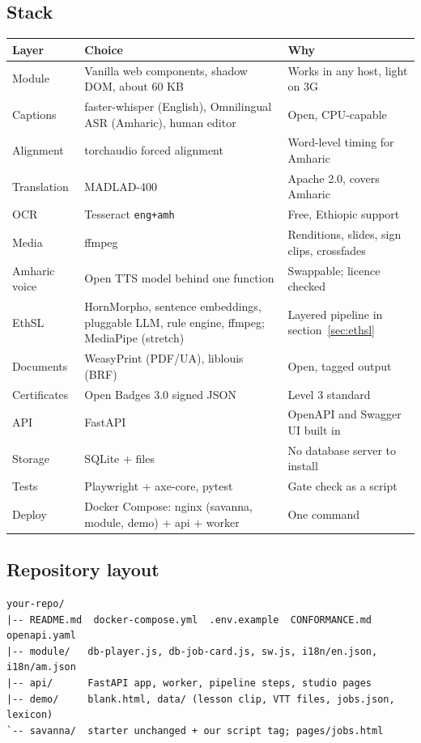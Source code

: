 \documentclass[11pt,a4paper]{article}
\newcommand{\code}[1]{\texttt{#1}}
\begin{document}
\subsection{Stack}
\begin{xltabular}{\textwidth}{@{}>{\raggedright\arraybackslash}p{2.6cm} X >{\raggedright\arraybackslash}p{4cm}@{}}
\toprule
\textbf{Layer} & \textbf{Choice} & \textbf{Why} \\
\midrule
\endhead
Module & Vanilla web components, shadow DOM, about 60 KB & Works in any host, light on 3G \\
Captions & faster-whisper (English), Omnilingual ASR (Amharic), human editor & Open, CPU-capable \\
Alignment & torchaudio forced alignment & Word-level timing for Amharic \\
Translation & MADLAD-400 & Apache 2.0, covers Amharic \\
OCR & Tesseract \code{eng+amh} & Free, Ethiopic support \\
Media & ffmpeg & Renditions, slides, sign clips, crossfades \\
Amharic voice & Open TTS model behind one function & Swappable; licence checked \\
EthSL & HornMorpho, sentence embeddings, pluggable LLM, rule engine, ffmpeg; MediaPipe (stretch) & Layered pipeline in section~\ref{sec:ethsl} \\
Documents & WeasyPrint (PDF/UA), liblouis (BRF) & Open, tagged output \\
Certificates & Open Badges 3.0 signed JSON & Level 3 standard \\
API & FastAPI & OpenAPI and Swagger UI built in \\
Storage & SQLite + files & No database server to install \\
Tests & Playwright + axe-core, pytest & Gate check as a script \\
Deploy & Docker Compose: nginx (savanna, module, demo) + api + worker & One command \\
\bottomrule
\end{xltabular}

\subsection{Repository layout}
\begin{verbatim}
your-repo/
|-- README.md  docker-compose.yml  .env.example  CONFORMANCE.md  openapi.yaml
|-- module/   db-player.js, db-job-card.js, sw.js, i18n/en.json, i18n/am.json
|-- api/      FastAPI app, worker, pipeline steps, studio pages
|-- demo/     blank.html, data/ (lesson clip, VTT files, jobs.json, lexicon)
`-- savanna/  starter unchanged + our script tag; pages/jobs.html
\end{verbatim}
\end{document}
